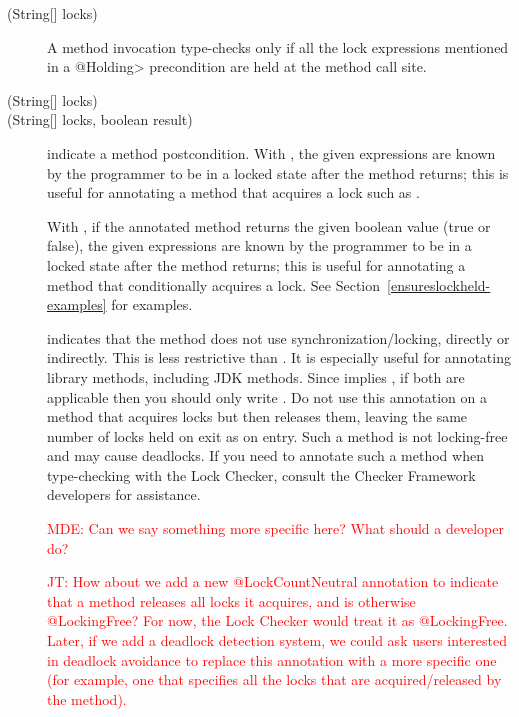 \begin{description}
\item[\small{(String[] locks)}]
  A method invocation type-checks only if all the lock expressions
  mentioned in a \<@Holding> precondition are held at the method call site.
\item[\small{(String[] locks)}]
\item[\small{(String[] locks, boolean result)}]
  indicate a method postcondition.  With , the given
  expressions are known by the programmer to be in
  a locked state after the method returns; this is useful for annotating a
  method that acquires a lock such as
  .

  With , if the annotated method returns the given
  boolean value (true or false), the given
  expressions are known by the programmer to be in
  a locked state after the method returns; this is useful for annotating a
  method that conditionally acquires a lock.
  See Section~\ref{ensureslockheld-examples} for examples.

\item[]
  indicates that the method does not use synchronization/locking,
  directly or indirectly.  This is less restrictive than
  . It is especially useful for
  annotating library methods, including JDK methods. Since
   implies , if both are applicable
  then you should only write .
  Do not use this annotation on a method that acquires locks but then releases
  them, leaving the same number of locks held on exit as on entry.  Such a
  method is not locking-free and may cause deadlocks.  If you need to annotate
  such a method when type-checking with the Lock Checker, consult the
  Checker Framework developers for assistance.

\textcolor{red}{MDE: Can we say something more specific here? What should a developer do?}

\textcolor{red}{JT: How about we add a new @LockCountNeutral annotation
to indicate that a method releases all locks it acquires, and is otherwise @LockingFree?
For now, the Lock Checker would treat it as @LockingFree.  Later, if we add a deadlock
detection system, we could ask users interested
in deadlock avoidance to replace this annotation with a more specific one (for example, one
that specifies all the locks that are acquired/released by the method).}

\end{description}


